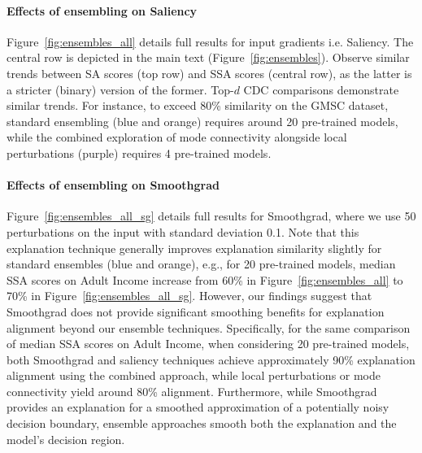 \paragraph{Effects of ensembling on Saliency} Figure~\ref{fig:ensembles_all} details full results for input gradients i.e. Saliency. The central row is depicted in the main text (Figure~\ref{fig:ensembles}). Observe similar trends between SA scores (top row) and SSA scores (central row), as the latter is a stricter (binary) version of the former. Top-$d$ CDC comparisons demonstrate similar trends. For instance, to exceed 80\% similarity on the GMSC dataset, standard ensembling (blue and orange) requires around 20 pre-trained models, while the combined exploration of mode connectivity alongside local perturbations (purple) requires 4 pre-trained models.

\paragraph{Effects of ensembling on Smoothgrad} Figure~\ref{fig:ensembles_all_sg} details full results for Smoothgrad, where we use 50 perturbations on the input with standard deviation 0.1. Note that this explanation technique generally improves explanation similarity slightly for standard ensembles (blue and orange), e.g., for 20 pre-trained models, median SSA scores on Adult Income increase from 60\% in Figure~\ref{fig:ensembles_all} to 70\% in Figure~\ref{fig:ensembles_all_sg}. However, our findings suggest that Smoothgrad does not provide significant smoothing benefits for explanation alignment beyond our ensemble techniques. Specifically, for the same comparison of median SSA scores on Adult Income, when considering 20 pre-trained models, both Smoothgrad and saliency techniques achieve approximately 90\% explanation alignment using the combined approach, while local perturbations or mode connectivity yield around 80\% alignment. Furthermore, while Smoothgrad provides an explanation for a smoothed approximation of a potentially noisy decision boundary, ensemble approaches smooth both the explanation and the model's decision region.

